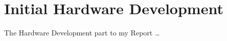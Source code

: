 \chapter{Initial Hardware Development} \label{Chapter:HardwareDevelopment}
The Hardware Development part to my Report \dots